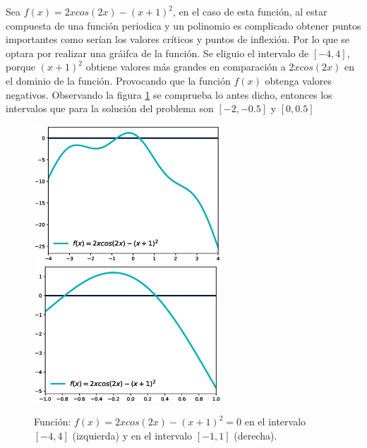 \begin{enumerate}
          Sea $f(x)=2xcos(2x)-(x+1)^2$, en el caso de esta función, al estar compuesta de una función periodica y un polinomio es complicado obtener puntos importantes como serían los valores críticos y puntos de inflexión. Por lo que se optara por realizar una gráifca de la función. Se eliguio el intervalo de $[-4,4]$, porque $(x+1)^2$ obtiene valores más grandes en comparación a $2xcos(2x)$ en el dominio de la función. Provocando que la función $f(x)$ obtenga valores negativos. Observando la figura \ref{fig:problema1b} se comprueba lo antes dicho, entonces los intervalos que para la solución del problema son $[-2,-0.5]$ y $[0,0.5]$
          \begin{figure}[H]
              \centering
              \includegraphics[width=7cm]{Graphics/function_2.eps}
              \includegraphics[width=7cm]{Graphics/function_2b.eps}
              \caption{Función: $f(x)=2xcos(2x)-(x+1)^2=0$ en el intervalo $[-4,4]$ (izquierda) y  en el intervalo $[-1,1]$ (derecha).}
              \label{fig:problema1b}
          \end{figure}
\end{enumerate}
